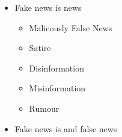 \documentclass[a4paper,landscape,headrule,footrule,xetex]{foils}
\begin{document}

\begin{itemize}
\item Fake news is  news
  \begin{itemize}
  \item Malicously False News
  \item Satire
  \item Disinformation
  \item Misinformation
  \item Rumour
  \end{itemize}
\item Fake news is  and  false news
\end{itemize}

\end{document}
